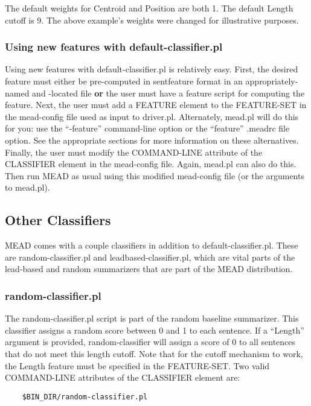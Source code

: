 \documentclass[10pt]{article}
\begin{document}
\noindent
The default weights for Centroid and Position are both 1.  The
default Length cutoff is 9.  The above example's weights were
changed for illustrative purposes.

\subsubsection{Using new features with default-classifier.pl}

Using new features with default-classifier.pl is relatively
easy.  First, the desired feature must either be pre-computed
in sentfeature format in an appropriately-named and
-located file {\bf or} the user must have a feature script
for computing the feature.  Next, the user must add a 
FEATURE element to the FEATURE-SET in the mead-config
file used as input to driver.pl.  Alternately, mead.pl
will do this for you: use the ``-feature'' command-line
option or the ``feature'' .meadrc file option.  See the
appropriate sections for more information on these
alternatives.  Finally, the user must modify the
COMMAND-LINE attribute of the CLASSIFIER element in the
mead-config file.  Again, mead.pl can also do this.
Then run MEAD as usual using this modified mead-config 
file (or the arguments to mead.pl).

\subsection{Other Classifiers}

MEAD comes with a couple classifiers in addition to 
default-classifier.pl.  These are random-classifier.pl
and leadbased-classifier.pl, which are vital parts of
the lead-based and random summarizers that are part of
the MEAD distribution.

\subsubsection{random-classifier.pl}

The random-classifier.pl script is part of the random
baseline summarizer.
This classifier assigns a random score between 0 and 1
to each sentence.  If a ``Length'' argument is provided,
random-classifier will assign a score of 0 to all sentences
that do not meet this length cutoff.  Note that for 
the cutoff mechanism to work, the Length feature must 
be specified in the FEATURE-SET.  Two valid 
COMMAND-LINE attributes of the CLASSIFIER element are:

\begin{verbatim}
    $BIN_DIR/random-classifier.pl
\end{verbatim}
\end{document}
